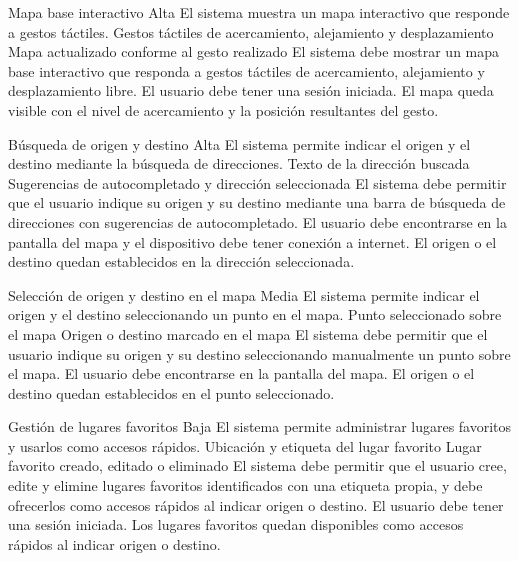   {Mapa base interactivo}%
  {Alta}%
  {El sistema muestra un mapa interactivo que responde a gestos táctiles.}%
  {Gestos táctiles de acercamiento, alejamiento y desplazamiento}%
  {Mapa actualizado conforme al gesto realizado}%
  {El sistema debe mostrar un mapa base interactivo que responda a gestos táctiles de acercamiento, alejamiento y desplazamiento libre.}%
  {El usuario debe tener una sesión iniciada.}%
  {El mapa queda visible con el nivel de acercamiento y la posición resultantes del gesto.}%

  {Búsqueda de origen y destino}%
  {Alta}%
  {El sistema permite indicar el origen y el destino mediante la búsqueda de direcciones.}%
  {Texto de la dirección buscada}%
  {Sugerencias de autocompletado y dirección seleccionada}%
  {El sistema debe permitir que el usuario indique su origen y su destino mediante una barra de búsqueda de direcciones con sugerencias de autocompletado.}%
  {El usuario debe encontrarse en la pantalla del mapa y el dispositivo debe tener conexión a internet.}%
  {El origen o el destino quedan establecidos en la dirección seleccionada.}%

  {Selección de origen y destino en el mapa}%
  {Media}%
  {El sistema permite indicar el origen y el destino seleccionando un punto en el mapa.}%
  {Punto seleccionado sobre el mapa}%
  {Origen o destino marcado en el mapa}%
  {El sistema debe permitir que el usuario indique su origen y su destino seleccionando manualmente un punto sobre el mapa.}%
  {El usuario debe encontrarse en la pantalla del mapa.}%
  {El origen o el destino quedan establecidos en el punto seleccionado.}%

  {Gestión de lugares favoritos}%
  {Baja}%
  {El sistema permite administrar lugares favoritos y usarlos como accesos rápidos.}%
  {Ubicación y etiqueta del lugar favorito}%
  {Lugar favorito creado, editado o eliminado}%
  {El sistema debe permitir que el usuario cree, edite y elimine lugares favoritos identificados con una etiqueta propia, y debe ofrecerlos como accesos rápidos al indicar origen o destino.}%
  {El usuario debe tener una sesión iniciada.}%
  {Los lugares favoritos quedan disponibles como accesos rápidos al indicar origen o destino.}%

